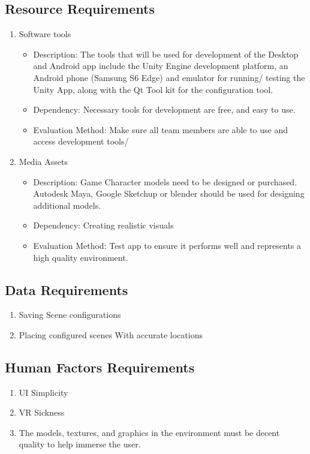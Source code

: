 \documentclass[a4paper,10pt]{article}
\begin{document}
	\subsection{Resource Requirements}
	\begin{enumerate}
	\item Software tools
	\begin{itemize}
	\item Description: The tools that will be used for development of the Desktop and Android app  include the Unity Engine development platform, an Android phone (Samsung S6 Edge) and emulator for running/ testing the Unity App,
	  along with the Qt Tool kit for the configuration tool.
	\item  Dependency: Necessary tools for development are free, and easy to use. 
	\item Evaluation Method: Make sure all team members are able to use and access development tools/
	  \end{itemize}
	\item Media Assets
	\begin{itemize}
	  \item Description: Game Character models need to be designed or purchased. Autodesk Maya, Google Sketchup or blender should be used for designing additional models. 
	  \item Dependency: Creating realistic visuals 
	  \item Evaluation Method: Test app to ensure it performs well and represents a high quality environment.
	\end{itemize}
	\end{enumerate}

	\subsection{Data Requirements}
	\begin{enumerate}
	\item Saving Scene configurations
	\item Placing configured scenes With accurate locations
	\end{enumerate}

	\subsection{Human Factors Requirements}
	\begin{enumerate}
	\item UI Simplicity
	\item VR Sickness	 
	\item The models, textures, and graphics in the environment must be decent quality to help immerse the user.
	\end{enumerate}
\end{document}
